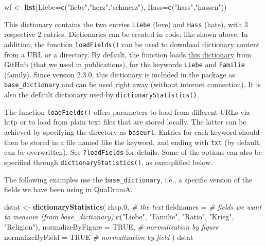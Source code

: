 \documentclass[]{book}
\newenvironment{Shaded}{\begin{snugshade}}{\end{snugshade}}
\newcommand{\CommentTok}[1]{\textcolor[rgb]{0.56,0.35,0.01}{\textit{#1}}}
\newcommand{\DataTypeTok}[1]{\textcolor[rgb]{0.13,0.29,0.53}{#1}}
\newcommand{\FloatTok}[1]{\textcolor[rgb]{0.00,0.00,0.81}{#1}}
\newcommand{\KeywordTok}[1]{\textcolor[rgb]{0.13,0.29,0.53}{\textbf{#1}}}
\newcommand{\NormalTok}[1]{#1}
\newcommand{\OtherTok}[1]{\textcolor[rgb]{0.56,0.35,0.01}{#1}}
\newcommand{\StringTok}[1]{\textcolor[rgb]{0.31,0.60,0.02}{#1}}
\begin{document}
\begin{Shaded}
\begin{Highlighting}[]
\NormalTok{wf <-}\StringTok{ }\KeywordTok{list}\NormalTok{(}\DataTypeTok{Liebe=}\KeywordTok{c}\NormalTok{(}\StringTok{"liebe"}\NormalTok{,}\StringTok{"herz"}\NormalTok{,}\StringTok{"schmerz"}\NormalTok{), }\DataTypeTok{Hass=}\KeywordTok{c}\NormalTok{(}\StringTok{"hass"}\NormalTok{,}\StringTok{"hassen"}\NormalTok{))}
\end{Highlighting}
\end{Shaded}

This dictionary contains the two entries \texttt{Liebe} (love) and \texttt{Hass} (hate), with 3 respective 2 entries. Dictionaries can be created in code, like shown above. In addition, the function \texttt{loadFields()} can be used to download dictionary content from a URL or a directory. By default, the function loads \href{https://github.com/quadrama/metadata/tree/master/fields/}{this dictionary} from GitHub (that we used in publications), for the keywords \texttt{Liebe} and \texttt{Familie} (family). Since version 2.3.0, this dictionary is included in the package as \texttt{base\_dictionary} and can be used right away (without internet connection). It is also the default dictionary used by \texttt{dictionaryStatistics()}.

The function \texttt{loadFields()} offers parameters to load from different URLs via http or to load from plain text files that are stored locally. The latter can be achieved by specifying the directory as \texttt{baseurl}. Entries for each keyword should then be stored in a file named like the keyword, and ending with \texttt{txt} (by default, can be overwritten). See \texttt{?loadFields} for details. Some of the options can also be specified through \texttt{dictionaryStatistics()}, as exemplified below.

The following examples use the \texttt{base\_dictionary}, i.e., a specific version of the fields we have been using in QuaDramA.

\begin{Shaded}
\begin{Highlighting}[]
\NormalTok{dstat <-}\StringTok{ }\KeywordTok{dictionaryStatistics}\NormalTok{(}
\NormalTok{  rksp}\FloatTok{.0}\NormalTok{,  }\CommentTok{# the text}
  \DataTypeTok{fieldnames =} \CommentTok{# fields we want to measure (from base_dictionary)}
    \KeywordTok{c}\NormalTok{(}\StringTok{"Liebe"}\NormalTok{, }\StringTok{"Familie"}\NormalTok{, }\StringTok{"Ratio"}\NormalTok{, }\StringTok{"Krieg"}\NormalTok{, }\StringTok{"Religion"}\NormalTok{),}
  \DataTypeTok{normalizeByFigure =} \OtherTok{TRUE}\NormalTok{,   }\CommentTok{# normalization by figure}
  \DataTypeTok{normalizeByField =} \OtherTok{TRUE}     \CommentTok{# normalization by field}
\NormalTok{)}
\NormalTok{dstat}
\end{Highlighting}
\end{Shaded}
\end{document}
